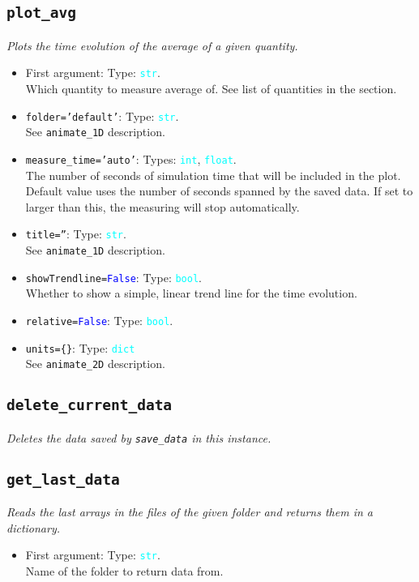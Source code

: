 \documentclass{article}
\newcommand{\ttt}[1]{\texttt{#1}}
\newcommand{\ptype}[1]{\texttt{\textcolor{cyan}{#1}}}
\newcommand{\cbl}[1]{\textcolor{blue}{#1}}
\newcommand{\cro}[1]{\textcolor{RedOrange}{#1}}
\newcommand{\cyo}[1]{\textcolor{YellowOrange}{#1}}
\begin{document}
\subsection{\ttt{plot\_avg}}
\label{sec:pa}
\textit{Plots the time evolution of the average of a given quantity.}
\begin{itemize}
	\item First argument: Type: \ptype{str}.\\Which quantity to measure average of. See list of quantities in the  section.
	\item \ttt{\cro{folder}=\cyo{'default'}}: Type: \ptype{str}.\\See \ttt{animate\_1D} description.
	\item \ttt{\cro{measure\_time}=\cyo{'auto'}}: Types: \ptype{int}, \ptype{float}.\\The number of seconds of simulation time that will be included in the plot. Default value uses the number of seconds spanned by the saved data. If set to larger than this, the measuring will stop automatically.
	\item \ttt{\cro{title}=\cyo{''}}: Type: \ptype{str}.\\See \ttt{animate\_1D} description.
	\item \ttt{\cro{showTrendline}=\cbl{False}}: Type: \ptype{bool}.\\Whether to show a simple, linear trend line for the time evolution.
	\item \ttt{\cro{relative}=\cbl{False}}: Type: \ptype{bool}.\\
	\item \ttt{\cro{units}=\{\}}: Type: \ptype{dict}\\See \ttt{animate\_2D} description.
\end{itemize}

\subsection{\ttt{delete\_current\_data}}
\label{sec:dcd}
\textit{Deletes the data saved by \ttt{save\_data} in this instance.}

\subsection{\ttt{get\_last\_data}}
\label{sec:gld}
\textit{Reads the last arrays in the files of the given folder and returns them in a dictionary.}
\begin{itemize}
	\item First argument: Type: \ptype{str}.\\Name of the folder to return data from.
\end{itemize}
\end{document}
